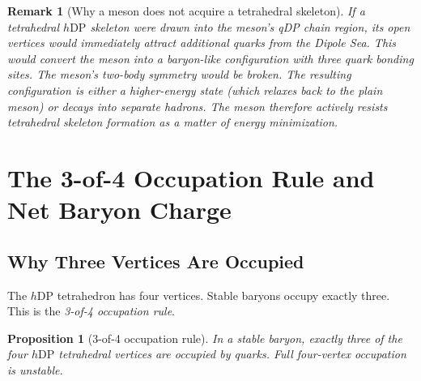 \documentclass[12pt]{article}
\newtheorem{proposition}[theorem]{Proposition}
\newtheorem{remark}[theorem]{Remark}
\newcommand{\hDP}{h\mathrm{DP}}
\begin{document}
\begin{remark}[Why a meson does not acquire a tetrahedral skeleton]
If a tetrahedral $\hDP$ skeleton were drawn into the meson's qDP chain
region, its open vertices would immediately attract additional quarks
from the Dipole Sea.  This would convert the meson into a baryon-like
configuration with three quark bonding sites.  The meson's two-body
symmetry would be broken.  The resulting configuration is either a
higher-energy state (which relaxes back to the plain meson) or decays
into separate hadrons.  The meson therefore actively resists tetrahedral
skeleton formation as a matter of energy minimization.
\end{remark}

\section{The 3-of-4 Occupation Rule and Net Baryon Charge}
\label{sec:occupation}

\subsection{Why Three Vertices Are Occupied}

The $\hDP$ tetrahedron has four vertices.  Stable baryons occupy
exactly three.  This is the \emph{3-of-4 occupation rule}.

\begin{proposition}[3-of-4 occupation rule]
\label{prop:three_of_four}
In a stable baryon, exactly three of the four $\hDP$ tetrahedral
vertices are occupied by quarks.  Full four-vertex occupation is
unstable.
\end{proposition}
\end{document}
